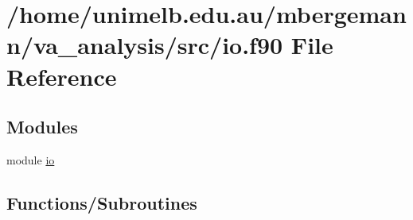 \hypertarget{io_8f90}{}\section{/home/unimelb.edu.\+au/mbergemann/va\+\_\+analysis/src/io.f90 File Reference}
\label{io_8f90}
\subsection*{Modules}
\begin{DoxyCompactItemize}
\item 
module \hyperlink{namespaceio}{io}
\end{DoxyCompactItemize}
\subsection*{Functions/\+Subroutines}
